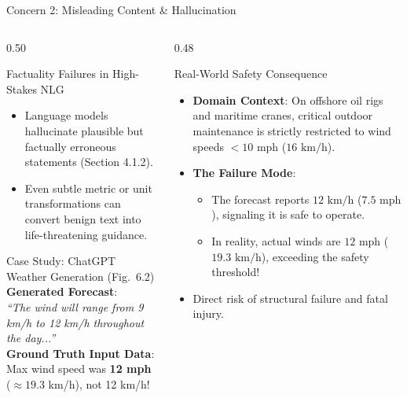 \documentclass[aspectratio=169, 10pt]{beamer}
\begin{document}
\begin{frame}{Concern 2: Misleading Content \& Hallucination}
  \begin{columns}[T]
    \begin{column}{0.50\textwidth}
      \begin{block}{Factuality Failures in High-Stakes NLG}
        \begin{itemize}
          \item Language models hallucinate plausible but factually erroneous statements (Section 4.1.2).
          \item Even subtle metric or unit transformations can convert benign text into life-threatening guidance.
        \end{itemize}
      \end{block}

      \begin{casebox}{Case Study: ChatGPT Weather Generation (Fig.\ 6.2)}
        \textbf{Generated Forecast}:\\
        \textit{``The wind will range from 9 km/h to 12 km/h throughout the day...''}\\
        \textbf{Ground Truth Input Data}:\\
        Max wind speed was \textbf{12 mph} ($\approx 19.3$ km/h), not 12 km/h!
      \end{casebox}
    \end{column}

    \begin{column}{0.48\textwidth}
      \begin{alertbox}{Real-World Safety Consequence}
        \begin{itemize}
          \item \textbf{Domain Context}: On offshore oil rigs and maritime cranes, critical outdoor maintenance is strictly restricted to wind speeds \alert{$< 10\text{ mph}$ ($16\text{ km/h}$)}.
          \item \textbf{The Failure Mode}:
          \begin{itemize}
            \item The forecast reports $12\text{ km/h}$ ($7.5\text{ mph}$), signaling it is safe to operate.
            \item In reality, actual winds are $12\text{ mph}$ ($19.3\text{ km/h}$), exceeding the safety threshold!
          \end{itemize}
          \item Direct risk of structural failure and fatal injury.
        \end{itemize}
      \end{alertbox}
    \end{column}
  \end{columns}
\end{frame}
\end{document}
